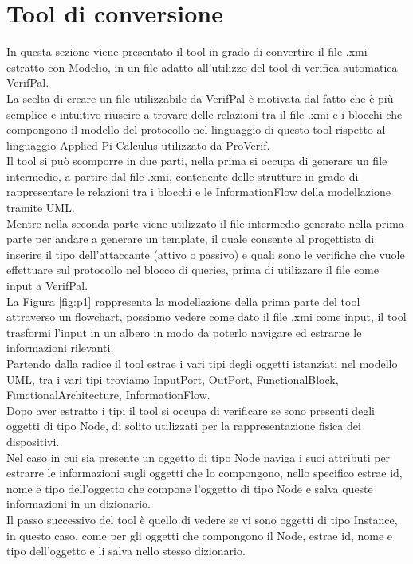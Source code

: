 \newpage
\section{Tool di conversione}
\label{sez:tc}

In questa sezione viene presentato il tool in grado di convertire il file .xmi estratto con Modelio, in un file adatto all'utilizzo del tool di verifica automatica VerifPal.\\
La scelta di creare un file utilizzabile da VerifPal è motivata dal fatto che è più semplice e intuitivo riuscire a trovare delle relazioni tra il file .xmi e i blocchi che compongono il modello del protocollo nel linguaggio di questo tool rispetto al linguaggio Applied Pi Calculus utilizzato da ProVerif.\\
Il tool si può scomporre in due parti, nella prima si occupa di generare un file intermedio, a partire dal file .xmi, contenente delle strutture in grado di rappresentare le relazioni tra i blocchi e le InformationFlow della modellazione tramite UML.\\ 
Mentre nella seconda parte viene utilizzato il file intermedio generato nella prima parte per andare a generare un template, il quale consente al progettista di inserire il tipo dell'attaccante (attivo o passivo) e quali sono le verifiche che vuole effettuare sul protocollo nel blocco di queries, prima di utilizzare il file come input a VerifPal.\\
La Figura \ref{fig:p1} rappresenta la modellazione della prima parte del tool attraverso un flowchart, possiamo vedere come dato il file .xmi come input, il tool trasformi l'input in un albero in modo da poterlo navigare ed estrarne le informazioni rilevanti.\\
Partendo dalla radice il tool estrae i vari tipi degli oggetti istanziati nel modello UML, tra i vari tipi troviamo InputPort, OutPort, FunctionalBlock, FunctionalArchitecture, InformationFlow.\\
Dopo aver estratto i tipi il tool si occupa di verificare se sono presenti degli oggetti di tipo Node, di solito utilizzati per la rappresentazione fisica dei dispositivi.\\ 
Nel caso in cui sia presente un oggetto di tipo Node naviga i suoi attributi per estrarre le informazioni sugli oggetti che lo compongono, nello specifico estrae id, nome e tipo dell'oggetto che compone l'oggetto di tipo Node e salva queste informazioni in un dizionario.\\
Il passo successivo del tool è quello di vedere se vi sono oggetti di tipo Instance, in questo caso, come per gli oggetti che compongono il Node, estrae id, nome e tipo dell'oggetto e li salva nello stesso dizionario.\\
